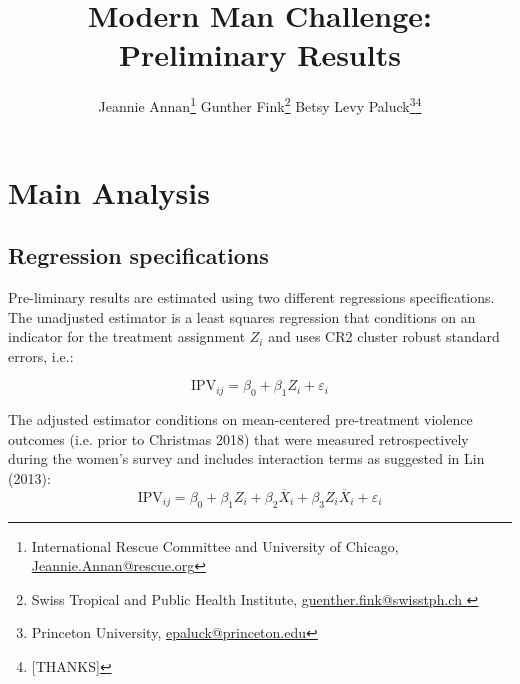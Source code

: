 \documentclass[11pt,english]{article}
\begin{document}
\title{Modern Man Challenge: Preliminary Results}

\author{
  Jeannie Annan\footnote{International Rescue Committee and University of Chicago, \href{Jeannie.Annan@rescue.org}{Jeannie.Annan@rescue.org}} \quad  
  Gunther Fink\footnote{Swiss Tropical and Public Health Institute, \href{guenther.fink@swisstph.ch }{guenther.fink@swisstph.ch }} \quad  
  Betsy Levy Paluck\footnote{Princeton University, \href{epaluck@princeton.edu}{epaluck@princeton.edu}}\thanks{
  [THANKS]
  } 
}


\maketitle




\clearpage

\tableofcontents

\newpage

\listoftables

\newpage

\setcounter{page}{1}

\doublespacing 

\section{Main Analysis}

\subsection{Regression specifications}

Pre-liminary results are estimated using two different regressions specifications. The unadjusted estimator is a least squares regression that conditions on an indicator for the treatment assignment $Z_i$ and uses CR2 cluster robust standard errors, i.e.:

\[\textrm{IPV}_{ij} = \beta_0 + \beta_1 Z_i + \varepsilon_i \]

The adjusted estimator conditions on mean-centered pre-treatment violence outcomes (i.e. prior to Christmas 2018) that were measured retrospectively during the women's survey and includes interaction terms as suggested in Lin (2013):
\[\textrm{IPV}_{ij} = \beta_0 + \beta_1 Z_i + \beta_2 \overline{X}_i + \beta_3 Z_i \overline{X}_i + \varepsilon_i\]
\end{document}
